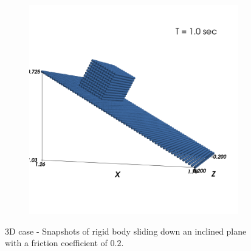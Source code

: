 \begin{figure}[!htpb]
  \begin{subfigure}{0.48\textwidth}
    \centering
    \includegraphics[width=1.0\textwidth]{figures/rfc/figures/mohseni_2021_free_sliding_on_a_slope_3d/fric_coeff_0_2/time2}
    \label{fig:passing-2}
  \end{subfigure}
  \caption{3D case - Snapshots of rigid body sliding down an inclined plane with a
    friction coefficient of $0.2$.}
\label{fig:mohseni-2021-sliding-3d}
\end{figure}


\FloatBarrier%
